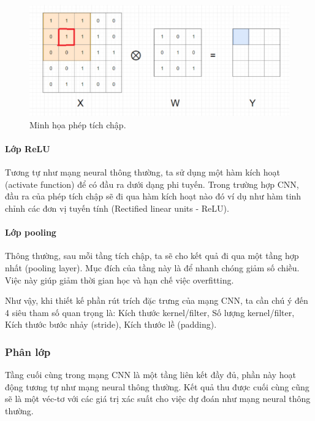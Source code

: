 \begin{figure}[H]
	\centering
	\includegraphics[width=1\linewidth]{images/padding18.png}
	\caption{Minh họa phép tích chập.}
	\label{fig:padding18}
\end{figure}

\paragraph{Lớp ReLU}

Tương tự như mạng neural thông thường, ta sử dụng một hàm kích hoạt (activate function) để có đầu ra dưới dạng phi tuyến. Trong trường hợp CNN, đầu ra của phép tích chập sẽ đi qua hàm kích hoạt nào đó ví dụ như hàm tinh chỉnh các đơn vị tuyến tính (Rectified linear units - ReLU). 

\paragraph{Lớp pooling}

Thông thường, sau mỗi tầng tích chập, ta sẽ cho kết quả đi qua một tầng hợp nhất (pooling layer). Mục đích của tầng này là để nhanh chóng giảm số chiều. Việc này giúp giảm thời gian học và hạn chế việc overfitting. 


Như vậy, khi thiết kế phần rút trích đặc trưng của mạng CNN, ta cần chú ý đến 4 siêu tham số quan trọng là: Kích thước kernel/filter, Số lượng kernel/filter, Kích thước bước nhảy (stride), Kích thước lề (padding).

\subsubsection{Phân lớp}
Tầng cuối cùng trong mạng CNN là một tầng liên kết đầy đủ, phần này hoạt động tương tự như mạng neural thông thường. Kết quả thu được cuối cùng cũng sẽ là một véc-tơ với các giá trị xác suất cho việc dự đoán như mạng neural thông thường.

